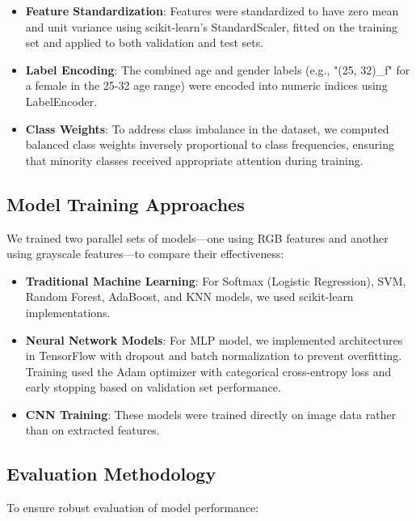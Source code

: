 \documentclass{article}
\begin{document}
\begin{itemize}
    \item \textbf{Feature Standardization}: Features were standardized to have zero mean and unit variance using scikit-learn's StandardScaler, fitted on the training set and applied to both validation and test sets.
    
    \item \textbf{Label Encoding}: The combined age and gender labels (e.g., "(25, 32)\_f" for a female in the 25-32 age range) were encoded into numeric indices using LabelEncoder.
    
    \item \textbf{Class Weights}: To address class imbalance in the dataset, we computed balanced class weights inversely proportional to class frequencies, ensuring that minority classes received appropriate attention during training.
\end{itemize}

\subsection{Model Training Approaches}

We trained two parallel sets of models—one using RGB features and another using grayscale features—to compare their effectiveness:

\begin{itemize}
    \item \textbf{Traditional Machine Learning}: For Softmax (Logistic Regression), SVM, Random Forest, AdaBoost, and KNN models, we used scikit-learn implementations.
    
    \item \textbf{Neural Network Models}: For MLP model, we implemented architectures in TensorFlow with dropout and batch normalization to prevent overfitting. Training used the Adam optimizer with categorical cross-entropy loss and early stopping based on validation set performance.
    
    \item \textbf{CNN Training}: These models were trained directly on image data rather than on extracted features.
\end{itemize}

\subsection{Evaluation Methodology}

To ensure robust evaluation of model performance:
\end{document}
